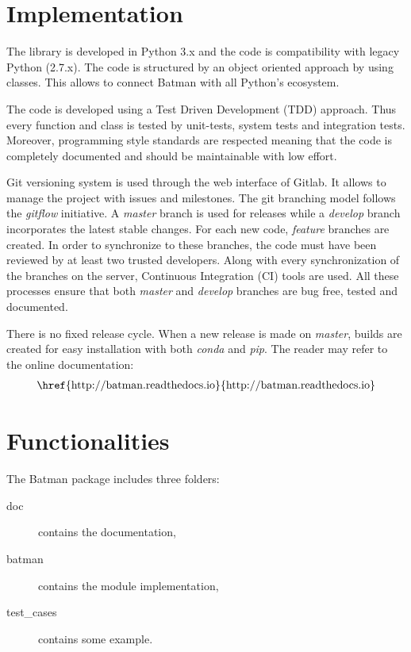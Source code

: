 \section{Implementation}

The library is developed in Python 3.x and the code is compatibility with legacy Python (2.7.x). The code is structured by an object oriented approach by using classes. This allows to connect Batman with all Python's ecosystem.

The code is developed using a Test Driven Development (TDD) approach. Thus every function and class is tested by unit-tests, system tests and integration tests. Moreover, programming style standards are respected meaning that the code is completely documented and should be maintainable with low effort.

Git versioning system is used through the web interface of Gitlab. It allows to manage the project with issues and milestones. The git branching model follows the \emph{gitflow} initiative. A \emph{master} branch is used for releases while a \emph{develop} branch incorporates the latest stable changes. For each new code, \emph{feature} branches are created. In order to synchronize to these branches, the code must have been reviewed by at least two trusted developers. Along with every synchronization of the branches on the server, Continuous Integration (CI) tools are used. All these processes ensure that both \emph{master} and \emph{develop} branches are bug free, tested and documented.

There is no fixed release cycle. When a new release is made on \emph{master}, builds are created for easy installation with both \emph{conda} and \emph{pip}. The reader may refer to the online documentation: 
\begin{align}
\text{\href{http://batman.readthedocs.io}{http://batman.readthedocs.io}}	\nonumber
\end{align}

\section{Functionalities}

The Batman package includes three folders:

\begin{description}
\item[doc] contains the documentation,
\item[batman] contains the module implementation,
\item[test\_cases] contains some example.
\end{description}

